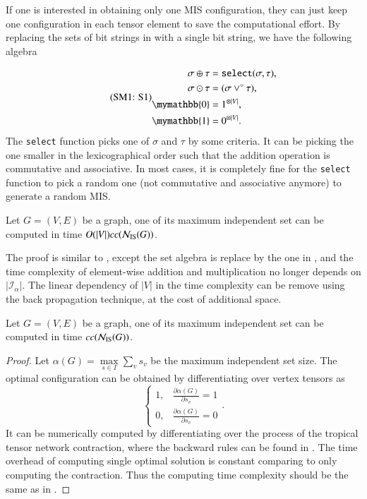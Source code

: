 \documentclass[review, onefignum, onetabnum]{siamart190516}
\begin{document}
If one is interested in obtaining only one MIS configuration, they can just keep one configuration in each tensor element to save the computational effort.
By replacing the sets of bit strings in  with a single bit string, we have the following algebra

\begin{equation}
\eqname{S1}
\begin{split}
    \sigma \oplus \tau &= \texttt{select}(\sigma, \tau), \\
    \sigma \odot \tau &= (\sigma\lor^\circ \tau),\\
    \mymathbb{0} &= 1^{\otimes |V|}, \\
    \mymathbb{1} &= 0^{\otimes |V|}.
\end{split}\label{eq:singleconfig}
\end{equation}
The \texttt{select} function picks one of $\sigma$ and $\tau$ by some criteria.
It can be picking the one smaller in the lexicographical order such that the addition operation is commutative and associative.
In most cases, it is completely fine for the \texttt{select} function to pick a random one (not commutative and associative anymore) to generate a random MIS.

\begin{theorem}
    Let $G = (V, E)$ be a graph, one of its maximum independent set can be computed in time $O(|V|)cc({\mathcal{N}_{\rm IS}(G)})$.
\end{theorem}
The proof is similar to , except the set algebra is replace by the one in , and the time complexity of element-wise addition and multiplication no longer depends on $|\mathcal{I}_\alpha|$.
The linear dependency of $|V|$ in the time complexity can be remove using the back propagation technique, at the cost of additional space.
\begin{theorem}
    Let $G = (V, E)$ be a graph, one of its maximum independent set can be computed in time $cc({\mathcal{N}_{\rm IS}(G)})$.
\end{theorem}
\begin{proof}
    Let $\alpha(G) = \max\limits_{s \in I} \sum_{v} s_v$ be the maximum independent set size. The optimal configuration can be obtained by differentiating over vertex tensors as
    \begin{equation}
    \begin{cases}
        1, &\frac{\partial \alpha(G)}{\partial s_v} = 1\\
        0, &\frac{\partial \alpha(G)}{\partial s_v} = 0
    \end{cases}.
    \end{equation}
    It can be numerically computed by differentiating over the process of the tropical tensor network contraction, where the backward rules can be found in . The time overhead of computing single optimal solution is constant comparing to only computing the contraction. Thus the computing time complexity should be the same as in .
\end{proof}
\end{document}
